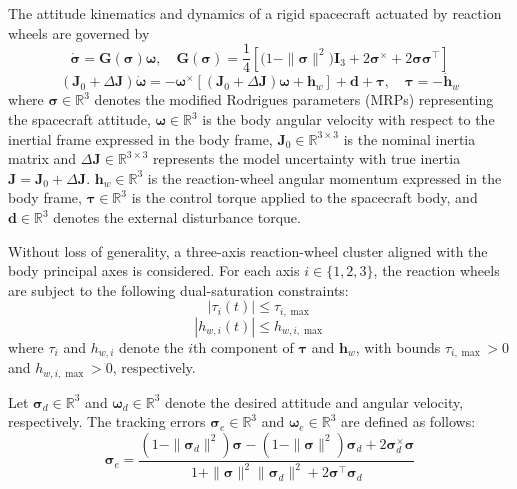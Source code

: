 \documentclass[journal]{new-aiaa}
\begin{document}
The attitude kinematics and dynamics of a rigid spacecraft actuated by reaction wheels are governed by
\begin{equation}
\dot{\boldsymbol{\sigma}} = \boldsymbol{G}(\boldsymbol{\sigma}) \boldsymbol{\omega}, 
\quad \boldsymbol{G}(\boldsymbol{\sigma}) = \frac{1}{4} \left[ \big(1 - \|\boldsymbol{\sigma}\|^2 \big) \boldsymbol{I}_3 + 2 {\boldsymbol{\sigma}}^{\times} + 2 \boldsymbol{\sigma} \boldsymbol{\sigma}^\top \right]
\label{eq:attitude_kinematics}
\end{equation}
\begin{equation}
(\boldsymbol{J}_0 + \Delta\boldsymbol{J}) \dot{\boldsymbol{\omega}} = 
- \boldsymbol{\omega}^{\times} [(\boldsymbol{J}_0 + \Delta\boldsymbol{J}) \boldsymbol{\omega} + \boldsymbol{h}_w ]
+ \boldsymbol{d} + \boldsymbol{\tau}, \quad \boldsymbol{\tau} = -\dot{\boldsymbol{h}}_w
\label{eq:attitude_dynamics}
\end{equation}
where $\boldsymbol{\sigma}\in\mathbb{R}^3$ denotes the modified Rodrigues parameters (MRPs) representing the spacecraft attitude,
$\boldsymbol{\omega}\in\mathbb{R}^3$ is the body angular velocity with respect to the inertial frame expressed in the body frame,
$\boldsymbol{J}_0\in\mathbb{R}^{3\times 3}$ is the nominal inertia matrix and $\Delta\boldsymbol{J}\in\mathbb{R}^{3\times 3}$ represents the model uncertainty with true inertia $\boldsymbol{J}=\boldsymbol{J}_0+\Delta\boldsymbol{J}$.
$\boldsymbol{h}_w\in\mathbb{R}^3$ is the reaction-wheel angular momentum expressed in the body frame,
$\boldsymbol{\tau}\in\mathbb{R}^3$ is the control torque applied to the spacecraft body,
and $\boldsymbol{d}\in\mathbb{R}^3$ denotes the external disturbance torque.


Without loss of generality, a three-axis reaction-wheel cluster aligned with the body principal axes is considered.
For each axis $i\in\{1,2,3\}$, the reaction wheels are subject to the following dual-saturation constraints:
\begin{equation}
|\tau_i(t)| \le \tau_{i,\max}
\label{eq:torque_saturation}
\end{equation}
\begin{equation}
|h_{w,i}(t)| \le h_{w,i,\max}
\label{eq:momentum_saturation}
\end{equation}
where $\tau_i$ and $h_{w,i}$ denote the $i$th component of $\boldsymbol{\tau}$ and $\boldsymbol{h}_w$, 
with bounds $\tau_{i,\max}>0$ and $h_{w,i,\max}>0$, respectively.

Let $\boldsymbol{\sigma}_d\in\mathbb{R}^3$ and $\boldsymbol{\omega}_d \in\mathbb{R}^3$ denote the desired attitude
and angular velocity, respectively. The tracking errors $\boldsymbol{\sigma}_e\in\mathbb{R}^3$
and $\boldsymbol{\omega}_e\in\mathbb{R}^3$ are defined as follows:
\begin{equation}
\boldsymbol{\sigma}_e =
\frac{(1-\|\boldsymbol{\sigma}_d\|^2)\boldsymbol{\sigma}-(1-\|\boldsymbol{\sigma}\|^2)\boldsymbol{\sigma}_d
+2\boldsymbol{\sigma}_d^{\times}\boldsymbol{\sigma}}
{1+\|\boldsymbol{\sigma}\|^2\|\boldsymbol{\sigma}_d\|^2+2\boldsymbol{\sigma}^\top\boldsymbol{\sigma}_d}
\end{equation}
\end{document}
